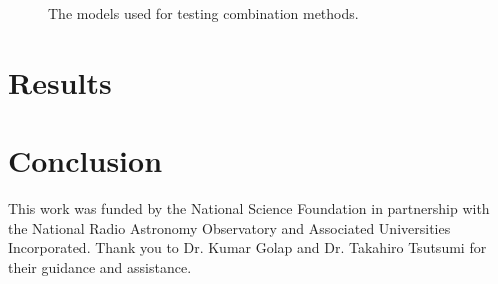 \documentclass[manuscript,linenumbers]{aastex62}
\begin{document}
\begin{figure*}[t]
    \caption{The models used for testing combination methods.}
    \label{models}
\end{figure*}

\section{Results}

\section{Conclusion}


\acknowledgments
This work was funded by the National Science Foundation in partnership with the National Radio Astronomy Observatory and Associated Universities Incorporated. Thank you to Dr. Kumar Golap and Dr. Takahiro Tsutsumi for their guidance and assistance. 


\end{document}
